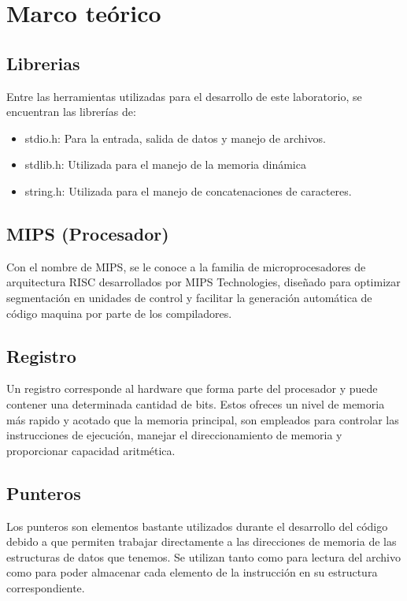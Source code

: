 \section{Marco teórico}

\subsection{Librerias}
\noindent Entre las herramientas utilizadas para el desarrollo de este laboratorio, se encuentran las librerías de:

\begin{itemize}
	\item stdio.h: Para la entrada, salida de datos y manejo de archivos.
    \item stdlib.h: Utilizada para el manejo de la memoria dinámica
	\item string.h: Utilizada para el manejo de concatenaciones de caracteres.
\end{itemize}

\subsection{MIPS (Procesador)}
\noindent Con el nombre de MIPS, se le conoce a la familia de microprocesadores de arquitectura RISC desarrollados por MIPS Technologies, diseñado para optimizar segmentación en unidades de control y facilitar la generación automática de código maquina por parte de los compiladores.

\subsection{Registro}
\noindent Un registro corresponde al hardware que forma parte del procesador y puede contener una determinada cantidad de bits. Estos ofreces un nivel de memoria más rapido y acotado que la memoria principal, son empleados para controlar las instrucciones de ejecución, manejar el direccionamiento de memoria y proporcionar capacidad aritmética.

\subsection{Punteros}
\noindent Los punteros son elementos bastante utilizados durante el desarrollo del código debido a que permiten trabajar directamente a las direcciones de memoria de las estructuras de datos que tenemos. Se utilizan tanto como para lectura del archivo como para poder almacenar cada elemento de la instrucción en su estructura correspondiente.


